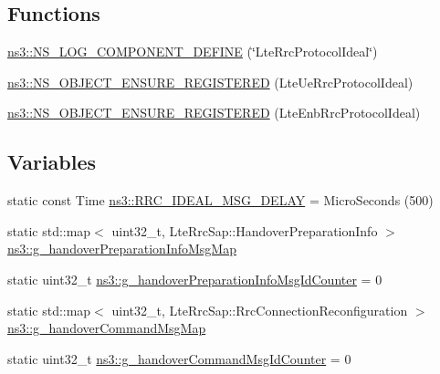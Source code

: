 \subsection*{Functions}
\begin{DoxyCompactItemize}
\item 
\hyperlink{namespacens3_a9039bbb441b726d70b80a22e690f21c4}{ns3\+::\+N\+S\+\_\+\+L\+O\+G\+\_\+\+C\+O\+M\+P\+O\+N\+E\+N\+T\+\_\+\+D\+E\+F\+I\+NE} (\char`\"{}Lte\+Rrc\+Protocol\+Ideal\char`\"{})
\item 
\hyperlink{namespacens3_a8514b5971d0b4ce5b6028905dc6c96c9}{ns3\+::\+N\+S\+\_\+\+O\+B\+J\+E\+C\+T\+\_\+\+E\+N\+S\+U\+R\+E\+\_\+\+R\+E\+G\+I\+S\+T\+E\+R\+ED} (Lte\+Ue\+Rrc\+Protocol\+Ideal)
\item 
\hyperlink{namespacens3_a990af870b1bdffed430906472f8e6c93}{ns3\+::\+N\+S\+\_\+\+O\+B\+J\+E\+C\+T\+\_\+\+E\+N\+S\+U\+R\+E\+\_\+\+R\+E\+G\+I\+S\+T\+E\+R\+ED} (Lte\+Enb\+Rrc\+Protocol\+Ideal)
\end{DoxyCompactItemize}
\subsection*{Variables}
\begin{DoxyCompactItemize}
\item 
static const Time \hyperlink{namespacens3_a491c1ae41d0f077411ab2b4e7ba7eca7}{ns3\+::\+R\+R\+C\+\_\+\+I\+D\+E\+A\+L\+\_\+\+M\+S\+G\+\_\+\+D\+E\+L\+AY} = Micro\+Seconds (500)
\item 
static std\+::map$<$ uint32\+\_\+t, Lte\+Rrc\+Sap\+::\+Handover\+Preparation\+Info $>$ \hyperlink{namespacens3_ad689fb5b09e0c6d2664564d7702a7057}{ns3\+::g\+\_\+handover\+Preparation\+Info\+Msg\+Map}
\item 
static uint32\+\_\+t \hyperlink{namespacens3_a81c49b1f2b9186e6563f062f368d2ce6}{ns3\+::g\+\_\+handover\+Preparation\+Info\+Msg\+Id\+Counter} = 0
\item 
static std\+::map$<$ uint32\+\_\+t, Lte\+Rrc\+Sap\+::\+Rrc\+Connection\+Reconfiguration $>$ \hyperlink{namespacens3_a91b859adf7aa4002786efb8373bed902}{ns3\+::g\+\_\+handover\+Command\+Msg\+Map}
\item 
static uint32\+\_\+t \hyperlink{namespacens3_ab0ce416eca2703c77fbb54df25089ef4}{ns3\+::g\+\_\+handover\+Command\+Msg\+Id\+Counter} = 0
\end{DoxyCompactItemize}
